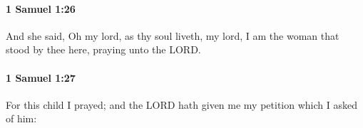 		\paragraph{1 Samuel 1:26} %
			\label{1SAMUEL-1-26}

			And she said, Oh my lord, as thy soul liveth, my lord, I am the woman that stood by thee here, praying unto the LORD.


		\paragraph{1 Samuel 1:27} %
			\label{1SAMUEL-1-27}

			For this child I prayed; and the LORD hath given me my petition which I asked of him:



